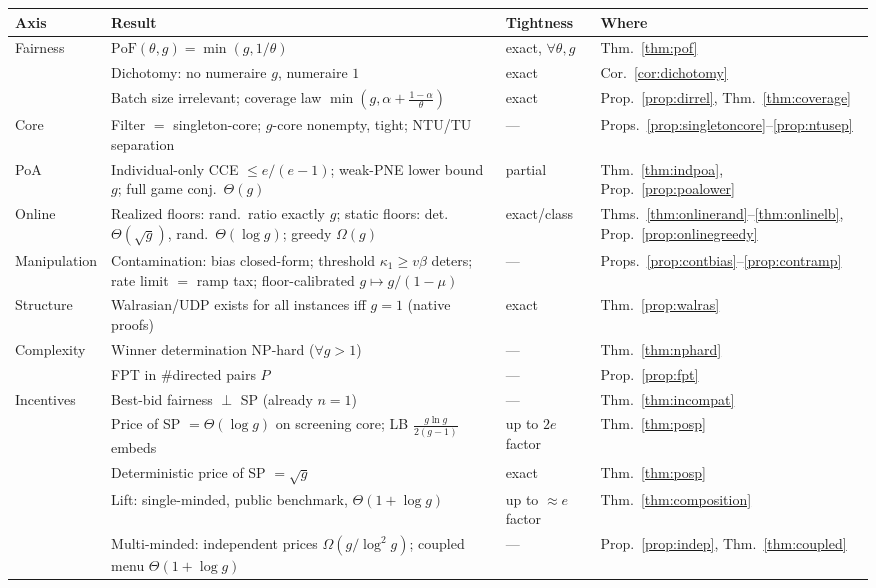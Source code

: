 \documentclass[11pt]{article}
\theoremstyle{remark}
\newcommand{\PoF}{\mathrm{PoF}}
\begin{document}
\begin{table}[t]
\centering
\small
\begin{tabular}{@{}llll@{}}
\toprule
Axis & Result & Tightness & Where \\
\midrule
Fairness & $\PoF(\theta,g)=\min(g,1/\theta)$ & exact, $\forall\theta,g$ & Thm.~\ref{thm:pof} \\
 & Dichotomy: no numeraire $g$, numeraire $1$ & exact & Cor.~\ref{cor:dichotomy} \\
 & Batch size irrelevant; coverage law $\min(g,\alpha+\frac{1-\alpha}{\theta})$ & exact & Prop.~\ref{prop:dirrel}, Thm.~\ref{thm:coverage} \\
Core & Filter $=$ singleton-core; $g$-core nonempty, tight; NTU/TU separation & --- & Props.~\ref{prop:singletoncore}--\ref{prop:ntusep} \\
PoA & Individual-only CCE $\le e/(e-1)$; weak-PNE lower bound $g$; full game conj.\ $\Theta(g)$ & partial & Thm.~\ref{thm:indpoa}, Prop.~\ref{prop:poalower} \\
Online & Realized floors: rand.\ ratio exactly $g$; static floors: det.\ $\Theta(\sqrt g)$, rand.\ $\Theta(\log g)$; greedy $\Omega(g)$ & exact/class & Thms.~\ref{thm:onlinerand}--\ref{thm:onlinelb}, Prop.~\ref{prop:onlinegreedy} \\
Manipulation & Contamination: bias closed-form; threshold $\kappa_1\ge v\beta$ deters; rate limit $=$ ramp tax; floor-calibrated $g\mapsto g/(1-\mu)$ & --- & Props.~\ref{prop:contbias}--\ref{prop:contramp} \\
Structure & Walrasian/UDP exists for all instances iff $g=1$ (native proofs) & exact & Thm.~\ref{prop:walras} \\
Complexity & Winner determination NP-hard ($\forall g>1$) & --- & Thm.~\ref{thm:nphard} \\
 & FPT in \#directed pairs $P$ & --- & Prop.~\ref{prop:fpt} \\
Incentives & Best-bid fairness $\perp$ SP (already $n=1$) & --- & Thm.~\ref{thm:incompat} \\
 & Price of SP $=\Theta(\log g)$ on screening core; LB $\frac{g\ln g}{2(g-1)}$ embeds & up to $2e$ factor & Thm.~\ref{thm:posp} \\
 & Deterministic price of SP $=\sqrt g$ & exact & Thm.~\ref{thm:posp} \\
 & Lift: single-minded, public benchmark, $\Theta(1+\log g)$ & up to $\approx e$ factor & Thm.~\ref{thm:composition} \\
 & Multi-minded: independent prices $\Omega(g/\log^2 g)$; coupled menu $\Theta(1+\log g)$ & --- & Prop.~\ref{prop:indep}, Thm.~\ref{thm:coupled} \\

\end{tabular}
\end{table}
\end{document}
